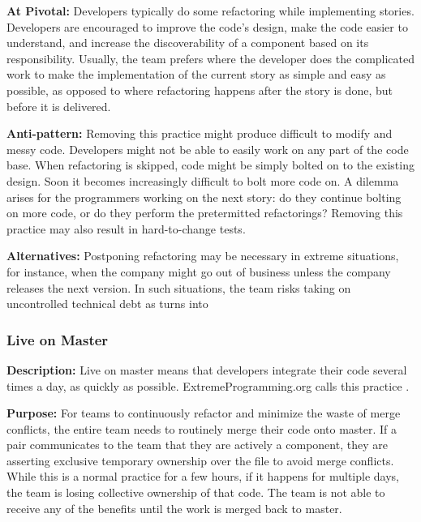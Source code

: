 \textbf{At Pivotal:} Developers typically do some refactoring while implementing stories. Developers are encouraged to improve the code's design, make the code easier to understand, and increase the discoverability of a component based on its responsibility. Usually, the team prefers  where the developer does the complicated work to make the implementation of the current story as simple and easy as possible, as opposed to  where refactoring happens after the story is done, but before it is delivered. 

\textbf{Anti-pattern:} Removing this practice might produce difficult to modify and messy code. Developers might not be able to easily work on any part of the code base. When refactoring is skipped, code might be simply bolted on to the existing design. Soon it becomes increasingly difficult to bolt more code on. A dilemma arises for the programmers working on the next story: do they continue bolting on more code, or do they perform the pretermitted refactorings? Removing this practice may also result in hard-to-change tests.

\textbf{Alternatives:} Postponing refactoring may be necessary in extreme situations, for instance, when the company might go out of business unless the company releases the next version. In such situations, the team risks taking on uncontrolled technical debt as  turns into  

\subsubsection{Live on Master}
\textbf{Description:} Live on master means that developers integrate their code several times a day, as quickly as possible. ExtremeProgramming.org calls this practice  \cite{WellsIntegrateOften}.

\textbf{Purpose:} For teams to continuously refactor and minimize the waste of merge conflicts, the entire team needs to routinely merge their code onto master. If a pair communicates to the team that they are actively  a component, they are asserting exclusive temporary ownership over the file to avoid merge conflicts. While this is a normal practice for a few hours, if it happens for multiple days, the team is losing collective ownership of that code. The team is not able to receive any of the benefits until the work is merged back to master. 

